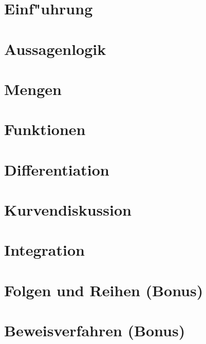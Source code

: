 \documentclass[12pt,a4paper,titlepage]{scrartcl}
\newcommand{\psection}[1]{\pagebreak\section{#1}}
\begin{document}

\clearpage

\psection{Einf"uhrung}


\psection{Aussagenlogik}


\psection{Mengen}


\psection{Funktionen}


\psection{Differentiation}


\psection{Kurvendiskussion}


\psection{Integration}


\psection{Folgen und Reihen (Bonus)}


\psection{Beweisverfahren (Bonus)}

\end{document}
